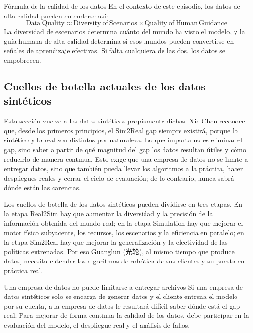 \documentclass[a4paper]{article}
\begin{document}
\begin{importantbox}{Fórmula de la calidad de los datos}
En el contexto de este episodio, los datos de alta calidad pueden entenderse así:
\[
\mathrm{Data\ Quality}\approx \mathrm{Diversity\ of\ Scenarios}\times \mathrm{Quality\ of\ Human\ Guidance}
\]
La diversidad de escenarios determina cuánto del mundo ha visto el modelo, y la guía humana de alta calidad determina si esos mundos pueden convertirse en señales de aprendizaje efectivas. Si falta cualquiera de las dos, los datos se empobrecen.
\end{importantbox}

\subsection{Cuellos de botella actuales de los datos sintéticos}

Esta sección vuelve a los datos sintéticos propiamente dichos. Xie Chen reconoce que, desde los primeros principios, el Sim2Real gap siempre existirá, porque lo sintético y lo real son distintos por naturaleza. Lo que importa no es eliminar el gap, sino saber a partir de qué magnitud del gap los datos resultan útiles y cómo reducirlo de manera continua. Esto exige que una empresa de datos no se limite a entregar datos, sino que también pueda llevar los algoritmos a la práctica, hacer despliegues reales y cerrar el ciclo de evaluación; de lo contrario, nunca sabrá dónde están las carencias.

Los cuellos de botella de los datos sintéticos pueden dividirse en tres etapas. En la etapa Real2Sim hay que aumentar la diversidad y la precisión de la información obtenida del mundo real; en la etapa Simulation hay que mejorar el motor físico subyacente, los recursos, los escenarios y la eficiencia en paralelo; en la etapa Sim2Real hay que mejorar la generalización y la efectividad de las políticas entrenadas. Por eso Guanglun (光轮), al mismo tiempo que produce datos, necesita entender los algoritmos de robótica de sus clientes y su puesta en práctica real.

\begin{warningbox}{Una empresa de datos no puede limitarse a entregar archivos}
Si una empresa de datos sintéticos solo se encarga de generar datos y el cliente entrena el modelo por su cuenta, a la empresa de datos le resultará difícil saber dónde está el gap real. Para mejorar de forma continua la calidad de los datos, debe participar en la evaluación del modelo, el despliegue real y el análisis de fallos.
\end{warningbox}
\end{document}
